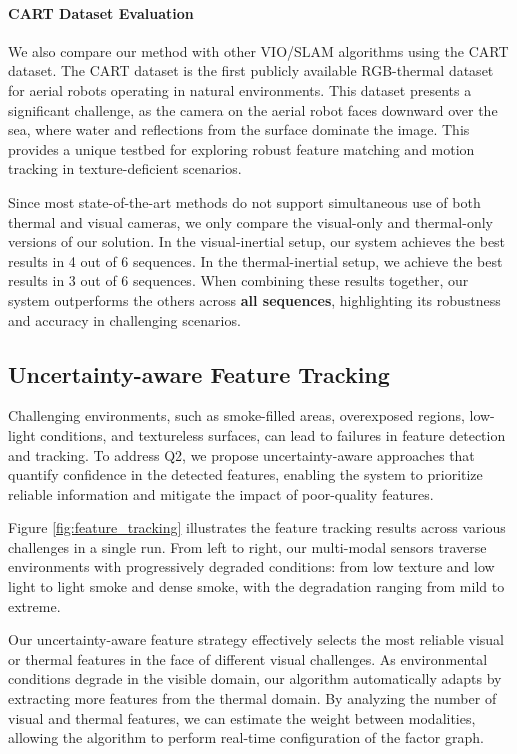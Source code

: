 \paragraph{\textbf{CART Dataset Evaluation}}
We also compare our method with other VIO/SLAM algorithms using the CART dataset\cite{lee2024caltech}. The CART dataset is the first publicly available RGB-thermal dataset for aerial robots operating in natural environments. This dataset presents a significant challenge, as the camera on the aerial robot faces downward over the sea, where water and reflections from the surface dominate the image. This provides a unique testbed for exploring robust feature matching and motion tracking in texture-deficient scenarios.

Since most state-of-the-art methods do not support simultaneous use of both thermal and visual cameras, we only compare the visual-only and thermal-only versions of our solution. In the visual-inertial setup, our system achieves the best results in 4 out of 6 sequences. In the thermal-inertial setup, we achieve the best results in 3 out of 6 sequences. When combining these results together, our system outperforms the others across \textbf{all sequences}, highlighting its robustness and accuracy in challenging scenarios.


\subsection{Uncertainty-aware Feature Tracking}
\label{sec:feature_corrspondence}
Challenging environments, such as smoke-filled areas, overexposed regions, low-light conditions, and textureless surfaces, can lead to failures in feature detection and tracking. To address Q2, we propose uncertainty-aware approaches that quantify confidence in the detected features, enabling the system to prioritize reliable information and mitigate the impact of poor-quality features.

Figure \ref{fig:feature_tracking} illustrates the feature tracking results across various challenges in a single run. From left to right, our multi-modal sensors traverse environments with progressively degraded conditions: from low texture and low light to light smoke and dense smoke, with the degradation ranging from mild to extreme.

Our uncertainty-aware feature strategy effectively selects the most reliable visual or thermal features in the face of different visual challenges. As environmental conditions degrade in the visible domain, our algorithm automatically adapts by extracting more features from the thermal domain. By analyzing the number of visual and thermal features, we can estimate the weight between modalities, allowing the algorithm to perform real-time configuration of the factor graph.

